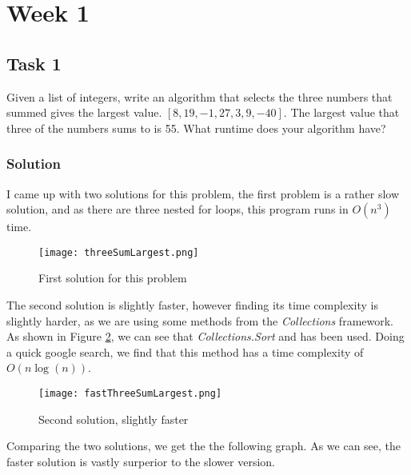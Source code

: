 \documentclass{article}
\begin{document}
   \section{Week 1} 
   \subsection{Task 1}

Given a list of integers, write an algorithm that selects the three numbers that summed gives the largest value. 
\( [8, 19, -1, 27, 3, 9, -40] \). The largest value that three of the numbers sums to is 55. What runtime does your algorithm have?

\subsubsection{Solution}
I came up with two solutions for this problem, the first problem is a rather slow solution, and as there are three nested for loops, this program runs in \( O\left( n^3 \right) \) time.

\begin{figure}[H]
    \begin{center}
        \texttt{[image: threeSumLargest.png]}
    \end{center}
    \caption{First solution for this problem}
    \label{fig:threeSumLargest}
\end{figure}

The second solution is slightly faster, however finding its time complexity is slightly harder, as we are using some methods from the \textit{Collections} framework. As shown in Figure \ref{fig:fastThreeSumLargest.png}, we can see that \textit{Collections.Sort} and has been used. Doing a quick google search, we find that this method has a time complexity of \( O\left( n \log\left( n \right) \right) \).

\begin{figure}[H]
    \begin{center}
        \texttt{[image: fastThreeSumLargest.png]}
    \end{center}
    \caption{Second solution, slightly faster}
    \label{fig:fastThreeSumLargest.png}
\end{figure}

Comparing the two solutions, we get the the following graph. As we can see, the faster solution is vastly surperior to the slower version.
\end{document}
